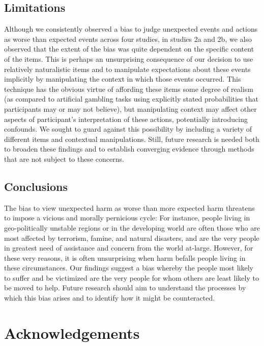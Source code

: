 \documentclass[10pt, letterpaper]{article}
\begin{document}
\subsection{Limitations}\label{limitations}

Although we consistently observed a bias to judge unexpected events and
actions as worse than expected events across four studies, in studies 2a
and 2b, we also observed that the extent of the bias was quite dependent
on the specific content of the items. This is perhaps an unsurprising
consequence of our decision to use relatively naturalistic items and to
manipulate expectations about these events implicitly by manipulating
the context in which those events occurred. This technique has the
obvious virtue of affording these items some degree of realism (as
compared to artificial gambling tasks using explicitly stated
probabilities that participants may or may not believe), but
manipulating context may affect other aspects of participant's
interpretation of these actions, potentially introducing confounds. We
sought to guard against this possibility by including a variety of
different items and contextual manipulations. Still, future research is
needed both to broaden these findings and to establish converging
evidence through methods that are not subject to these concerns.

\subsection{Conclusions}\label{conclusions}

The bias to view unexpected harm as worse than more expected harm
threatens to impose a vicious and morally pernicious cycle: For
instance, people living in geo-politically unstable regions or in the
developing world are often those who are most affected by terrorism,
famine, and natural disasters, and are the very people in greatest need
of assistance and concern from the world at-large. However, for these
very reasons, it is often unsurprising when harm befalls people living
in these circumstances. Our findings suggest a bias whereby the people
most likely to suffer and be victimized are the very people for whom
others are least likely to be moved to help. Future research should aim
to understand the processes by which this bias arises and to identify
how it might be counteracted.

\section{Acknowledgements}\label{acknowledgements}
\end{document}
